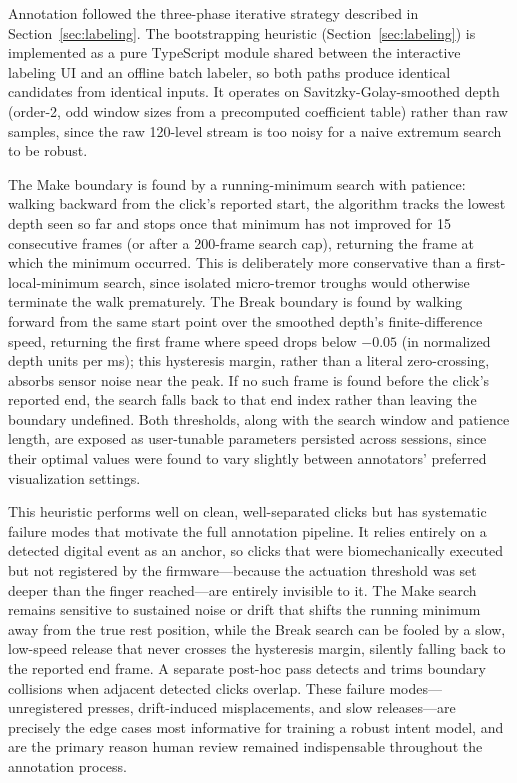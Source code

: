 Annotation followed the three-phase iterative strategy described in Section~\ref{sec:labeling}. The bootstrapping heuristic (Section~\ref{sec:labeling}) is implemented as a pure TypeScript module shared between the interactive labeling UI and an offline batch labeler, so both paths produce identical candidates from identical inputs. It operates on Savitzky-Golay-smoothed depth (order-2, odd window sizes from a precomputed coefficient table) rather than raw samples, since the raw 120-level stream is too noisy for a naive extremum search to be robust.

The Make boundary is found by a running-minimum search with patience: walking backward from the click's reported start, the algorithm tracks the lowest depth seen so far and stops once that minimum has not improved for 15 consecutive frames (or after a 200-frame search cap), returning the frame at which the minimum occurred. This is deliberately more conservative than a first-local-minimum search, since isolated micro-tremor troughs would otherwise terminate the walk prematurely. The Break boundary is found by walking forward from the same start point over the smoothed depth's finite-difference speed, returning the first frame where speed drops below $-0.05$ (in normalized depth units per ms); this hysteresis margin, rather than a literal zero-crossing, absorbs sensor noise near the peak. If no such frame is found before the click's reported end, the search falls back to that end index rather than leaving the boundary undefined. Both thresholds, along with the search window and patience length, are exposed as user-tunable parameters persisted across sessions, since their optimal values were found to vary slightly between annotators' preferred visualization settings.

This heuristic performs well on clean, well-separated clicks but has systematic failure modes that motivate the full annotation pipeline. It relies entirely on a detected digital event as an anchor, so clicks that were biomechanically executed but not registered by the firmware---because the actuation threshold was set deeper than the finger reached---are entirely invisible to it. The Make search remains sensitive to sustained noise or drift that shifts the running minimum away from the true rest position, while the Break search can be fooled by a slow, low-speed release that never crosses the hysteresis margin, silently falling back to the reported end frame. A separate post-hoc pass detects and trims boundary collisions when adjacent detected clicks overlap. These failure modes---unregistered presses, drift-induced misplacements, and slow releases---are precisely the edge cases most informative for training a robust intent model, and are the primary reason human review remained indispensable throughout the annotation process.

